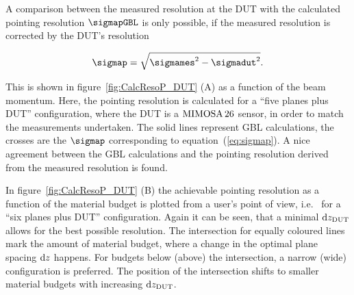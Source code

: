 A comparison between the measured resolution at the DUT with the calculated pointing resolution $\sigmapGBL$ is only possible, if the measured resolution is corrected by the DUT's resolution

\begin{equation}
 \sigmap = \sqrt{\sigmames^2 - \sigmadut^2}.
 \label{eq:sigmap}
\end{equation}

\noindent
This is shown in figure~\ref{fig:CalcResoP_DUT} (A) as a function of the beam momentum. 
Here, the pointing resolution is calculated for a ``five planes plus DUT'' configuration, where the DUT is a $\textrm{MIMOSA\,26}$ sensor, in order to match the measurements undertaken. 
The solid lines represent GBL calculations, the crosses are the $\sigmap$ corresponding to equation~(\ref{eq:sigmap}). 
A nice agreement between the GBL calculations and the pointing resolution derived from the measured resolution is found.

In figure~\ref{fig:CalcResoP_DUT} (B) the achievable pointing resolution as a function of the material budget is plotted from a user's point of view, i.e.~ for a ``six planes plus DUT'' configuration. 
Again it can be seen, that a minimal $\textrm{d}z_{\textrm{DUT}}$ allows for the best possible resolution. 
The intersection for equally coloured lines mark the amount of material budget, where a change in the optimal plane spacing $\textrm{d}z$ happens.
For budgets below (above) the intersection, a narrow (wide) configuration is preferred.
The position of the intersection shifts to smaller material budgets with increasing $\textrm{d}z_{\textrm{DUT}}$. 

